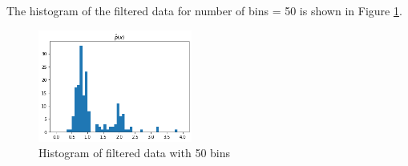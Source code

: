 The histogram of the filtered data for number of bins = 50 is shown in Figure \ref{fig:q1_2_e}.

\begin{figure}[H]
    \centering
    \includegraphics[width=0.45\textwidth]{../q1/images/optimalhistogram.png}
    \caption{Histogram of filtered data with 50 bins}
    \label{fig:q1_2_e}
\end{figure}
    